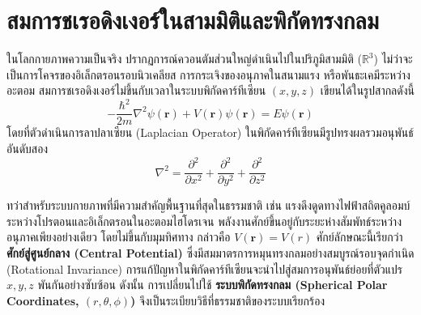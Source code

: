 \newpage
\section{สมการชเรอดิงเงอร์ในสามมิติและพิกัดทรงกลม}

ในโลกกายภาพความเป็นจริง ปรากฏการณ์ควอนตัมส่วนใหญ่ดำเนินไปในปริภูมิสามมิติ ($\mathbb{R}^3$) ไม่ว่าจะเป็นการโคจรของอิเล็กตรอนรอบนิวเคลียส การกระเจิงของอนุภาคในสนามแรง หรือพันธะเคมีระหว่างอะตอม สมการชเรอดิงเงอร์ไม่ขึ้นกับเวลาในระบบพิกัดคาร์ทีเซียน $(x, y, z)$ เขียนได้ในรูปสากลดังนี้
\begin{equation}
-\frac{\hbar^2}{2m} \nabla^2 \psi(\mathbf{r}) + V(\mathbf{r}) \psi(\mathbf{r}) = E \psi(\mathbf{r})
\label{eq:tise_3d_cartesian}
\end{equation}
โดยที่ตัวดำเนินการลาปลาเซียน (Laplacian Operator) ในพิกัดคาร์ทีเซียนมีรูปทรงผลรวมอนุพันธ์อันดับสอง
\begin{equation}
\nabla^2 = \frac{\partial^2}{\partial x^2} + \frac{\partial^2}{\partial y^2} + \frac{\partial^2}{\partial z^2}
\end{equation}

ทว่าสำหรับระบบกายภาพที่มีความสำคัญพื้นฐานที่สุดในธรรมชาติ เช่น แรงดึงดูดทางไฟฟ้าสถิตคูลอมบ์ระหว่างโปรตอนและอิเล็กตรอนในอะตอมไฮโดรเจน พลังงานศักย์ขึ้นอยู่กับระยะห่างสัมพัทธ์ระหว่างอนุภาคเพียงอย่างเดียว โดยไม่ขึ้นกับมุมทิศทาง กล่าวคือ $V(\mathbf{r}) = V(r)$ ศักย์ลักษณะนี้เรียกว่า \textbf{ศักย์สู่ศูนย์กลาง (Central Potential)} ซึ่งมีสมมาตรการหมุนทรงกลมอย่างสมบูรณ์รอบจุดกำเนิด (Rotational Invariance) การแก้ปัญหาในพิกัดคาร์ทีเซียนจะนำไปสู่สมการอนุพันธ์ย่อยที่ตัวแปร $x, y, z$ พันกันอย่างซับซ้อน ดังนั้น การเปลี่ยนไปใช้ \textbf{ระบบพิกัดทรงกลม (Spherical Polar Coordinates, $(r, \theta, \phi)$)} จึงเป็นระเบียบวิธีที่ธรรมชาติของระบบเรียกร้อง

